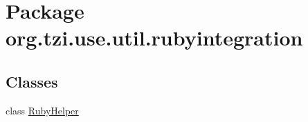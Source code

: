 \hypertarget{namespaceorg_1_1tzi_1_1use_1_1util_1_1rubyintegration}{\section{Package org.\-tzi.\-use.\-util.\-rubyintegration}
\label{namespaceorg_1_1tzi_1_1use_1_1util_1_1rubyintegration}
}
\subsection*{Classes}
\begin{DoxyCompactItemize}
\item 
class \hyperlink{classorg_1_1tzi_1_1use_1_1util_1_1rubyintegration_1_1_ruby_helper}{Ruby\-Helper}
\end{DoxyCompactItemize}
